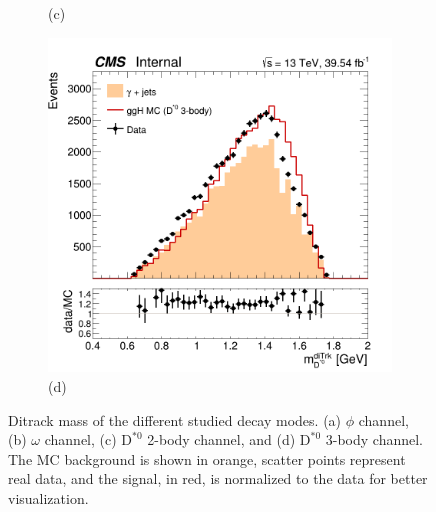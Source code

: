 \begin{figure}[!ht]
\begin{subfigure}[t]{0.50\mylength}
        \vspace*{-0.2cm}
        \caption{\footnotesize (c)}
    \end{subfigure}%
    \begin{subfigure}[t]{0.50\mylength}
        \centering
        \includegraphics[width=0.49\mylength]{resources/plots/D0Star_3body_ditrk_mass.png}
        \vspace*{-0.2cm}
        \caption{\footnotesize (d)}
    \end{subfigure}%
\caption{Ditrack mass of the different studied decay modes. (a) $\phi$ channel, (b) $\omega$ channel, (c) $\text{D}^{*0}$ 2-body channel, and (d) $\text{D}^{*0}$ 3-body channel. The MC background is shown in orange, scatter points represent real data, and the signal, in red, is normalized to the data for better visualization.}
\label{fig:ditrack_mass_data}
    \vspace*{-0.0cm}
\end{figure}

\newpage

